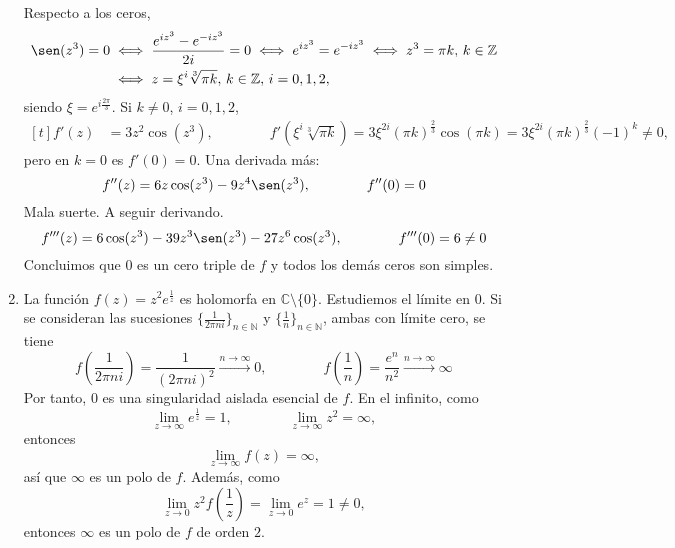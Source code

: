 \documentclass[11pt]{report}
\makeatletter
\renewenvironment{proof}[1][\proofname]{\par
  \pushQED{\qed}%
  \normalfont \topsep\z@skip %
  \trivlist
  \item[\hskip\labelsep
        \itshape
    #1\@addpunct{.}]\ignorespaces
}{%
  \popQED\endtrivlist\@endpefalse
}
\newcommand{\N}{\mathbb N}
\newcommand{\Z}{\mathbb Z}
\newcommand{\C}{\mathbb C}
\makeatother
\begin{document}
\begin{proof}
\begin{enumerate}
    Respecto a los ceros,
    \[\begin{aligned}[t]\sen(z^3) = 0 &\iff \frac{e^{iz^3}-e^{-iz^3}}{2i} = 0 \iff e^{iz^3} = e^{-iz^3} \iff z^3=\pi k, \, k \in \Z \\ &\iff z = \xi^i \sqrt[3]{\pi k}, \, k \in \Z, \, i = 0,1,2,\end{aligned}\]
    siendo $\xi = e^{i\frac{2\pi}{3}}$.
    Si $k \neq 0$, $i=0,1,2$,
    \[\begin{aligned}[t]
      f'(z)&=3z^2\cos(z^3), \qquad \qquad f'\left(\xi^i\sqrt[3]{\pi k}\right) = 3\xi^{2i}(\pi k)^{\frac{2}{3}}\cos(\pi k) =  3\xi^{2i}(\pi k)^{\frac{2}{3}}(-1)^k \neq 0,
    \end{aligned}\]
    pero en $k=0$ es $f'(0) = 0$. Una derivada más:
    \[f''(z) = 6z\cos(z^3)-9z^4\sen(z^3), \qquad \qquad f''(0) = 0\]
    Mala suerte. A seguir derivando.
    \[f'''(z)=6\cos(z^3)-39z^3\sen(z^3)-27z^6\cos(z^3), \qquad \qquad f'''(0) = 6 \neq 0\]
    Concluimos que $0$ es un cero triple de $f$ y todos los demás ceros son simples.
    \item La función $f(z)=z^2e^{\frac{1}{z}}$ es holomorfa en $\C \setminus \{0\}$. Estudiemos el límite en $0$. Si se consideran las sucesiones $\{\frac{1}{2\pi ni}\}_{n \in \N}$ y $\{\frac{1}{n}\}_{n \in \N}$, ambas con límite cero, se tiene
    \[f\left(\frac{1}{2\pi ni}\right) =\frac{1}{(2\pi n i)^2} \xrightarrow[]{n \to \infty}0, \qquad \qquad f\left(\frac{1}{n}\right) = \frac{e^n}{n^2}\xrightarrow[]{n \to \infty}\infty\]
    Por tanto, $0$ es una singularidad aislada esencial de $f$. En el infinito, como
    \[\lim_{z \to \infty}e^{\frac{1}{z}} = 1, \qquad \qquad \lim_{z \to \infty} z^2 = \infty,\]
    entonces
    \[\lim_{z \to \infty}f(z)=\infty,\]
    así que $\infty$ es un polo de $f$. Además, como
    \[\lim_{z \to 0} z^2f\left(\frac{1}{z}\right) = \lim_{z \to 0} e^z = 1 \neq 0,\]
    entonces $\infty$ es un polo de $f$ de orden $2$.
    

\end{enumerate}
\end{proof}
\end{document}

